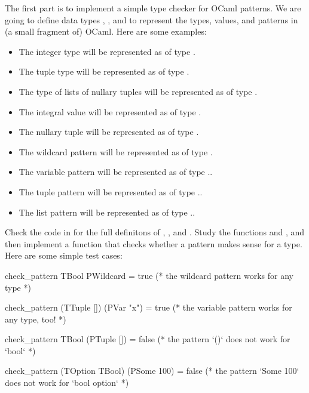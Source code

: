 \documentclass[fleqn]{article}
\begin{document}
The first part is to implement a simple type checker for OCaml patterns. We are going to define data types , , and  to represent the types, values, and patterns in (a small fragment of) OCaml. Here are some examples:
\begin{itemize}
  \item The integer type  will be represented as  of type .
  \item The tuple type  will be represented as  of type .
  \item The type of lists of nullary tuples  will be represented as  of type .
  \item The integral value  will be represented as  of type .
  \item The nullary tuple \ocaml{()} will be represented as  of type .
  \item The wildcard pattern \ocaml{\_} will be represented as  of type .
  \item The variable pattern  will be represented as  of type ..
  \item The tuple pattern  will be represented as  of type ..
  \item The list pattern  will be represented as  of type ..
\end{itemize}
Check the code in  for the full definitons of , , and . Study the functions  and , and then implement a function  that checks whether a pattern makes sense for a type. Here are some simple test cases:

\begin{ocamlcode}
check_pattern TBool PWildcard = true
(* the wildcard pattern works for any type *)

check_pattern (TTuple []) (PVar "x") = true
(* the variable pattern works for any type, too! *)

check_pattern TBool (PTuple []) = false
(* the pattern `()` does not work for `bool` *)

check_pattern (TOption TBool) (PSome 100) = false
(* the pattern `Some 100` does not work for `bool option` *)
\end{ocamlcode}
\end{document}
